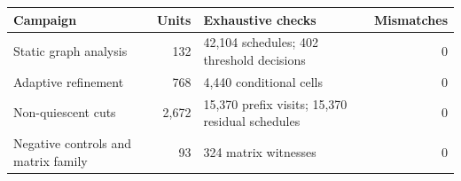 \begin{tabularx}{\textwidth}{@{}p{}rXr@{}}
\toprule
Campaign & Units & Exhaustive checks & Mismatches \\
\midrule
Static graph analysis & 132 & 42,104 schedules; 402 threshold decisions & 0 \\
Adaptive refinement & 768 & 4,440 conditional cells & 0 \\
Non-quiescent cuts & 2,672 & 15,370 prefix visits; 15,370 residual schedules & 0 \\
Negative controls and matrix family & 93 & 324 matrix witnesses & 0 \\
\bottomrule
\end{tabularx}
